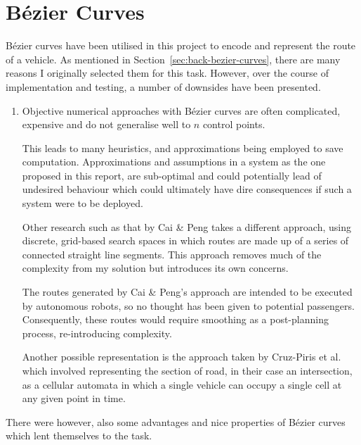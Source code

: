 \section{Bézier Curves}

Bézier curves have been utilised in this project to encode and represent the route of a vehicle. As mentioned in Section~\ref{sec:back-bezier-curves}, there are many reasons I originally selected them for this task. However, over the course of implementation and testing, a number of downsides have been presented.

\begin{enumerate}
  \item Objective numerical approaches with Bézier curves are often complicated, expensive and do not generalise well to $n$ control points.

        This leads to many heuristics, and approximations being employed to save computation. Approximations and assumptions in a system as the one proposed in this report, are sub-optimal and could potentially lead of undesired behaviour which could ultimately have dire consequences if such a system were to be deployed.

        Other research such as that by Cai \& Peng\cite{caiCooperativeCoevolutionaryAdaptive2002} takes a different approach, using discrete, grid-based search spaces in which routes are made up of a series of connected straight line segments. This approach removes much of the complexity from my solution but introduces its own concerns.

        The routes generated by Cai \& Peng's approach are intended to be executed by autonomous robots, so no thought has been given to potential passengers. Consequently, these routes would require smoothing as a post-planning process, re-introducing complexity.

        Another possible representation is the approach taken by Cruz-Piris et al.\cite{cruz-pirisAutomatedOptimizationIntersections2019} which involved representing the section of road, in their case an intersection, as a cellular automata in which a single vehicle can occupy a single cell at any given point in time. \end{enumerate}


There were however, also some advantages and nice properties of Bézier curves which lent themselves to the task.

